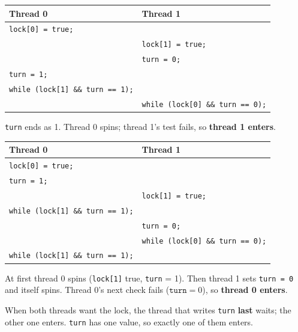 \documentclass[11pt,a4paper]{article}
\begin{document}
\begin{solbox}
\begin{center}
\renewcommand{\arraystretch}{1.08}
\begin{tabular}{@{}ll@{}}
  \toprule
  \textbf{Thread 0} & \textbf{Thread 1} \\
  \midrule
  \texttt{lock[0] = true;} & \\
  & \texttt{lock[1] = true;} \\
  & \texttt{turn = 0;} \\
  \texttt{turn = 1;} & \\
  \texttt{while (lock[1] \&\& turn == 1);} & \\
  & \texttt{while (lock[0] \&\& turn == 0);} \\
  \bottomrule
\end{tabular}
\end{center}
\texttt{turn} ends as 1. Thread 0 spins; thread 1's test fails, so
\textbf{thread 1 enters}.
\end{solbox}

\begin{solbox}
\begin{center}
\renewcommand{\arraystretch}{1.08}
\begin{tabular}{@{}ll@{}}
  \toprule
  \textbf{Thread 0} & \textbf{Thread 1} \\
  \midrule
  \texttt{lock[0] = true;} & \\
  \texttt{turn = 1;} & \\
  & \texttt{lock[1] = true;} \\
  \texttt{while (lock[1] \&\& turn == 1);} & \\
  & \texttt{turn = 0;} \\
  & \texttt{while (lock[0] \&\& turn == 0);} \\
  \texttt{while (lock[1] \&\& turn == 1);} & \\
  \bottomrule
\end{tabular}
\end{center}
At first thread 0 spins (\texttt{lock[1]} true, \texttt{turn} = 1). Then
thread 1 sets \texttt{turn = 0} and itself spins. Thread 0's next check
fails (\(\texttt{turn} = 0\)), so \textbf{thread 0 enters}.
\end{solbox}

\begin{keybox}[Pattern]
When both threads want the lock, the thread that writes \texttt{turn}
\textbf{last} waits; the other one enters. \texttt{turn} has one value, so
exactly one of them enters.
\end{keybox}
\end{document}
